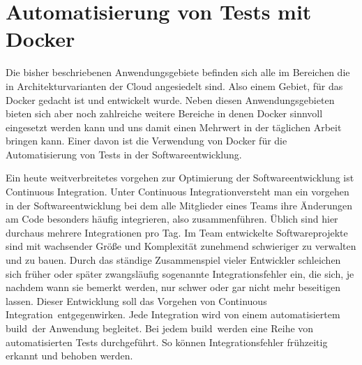 \section{Automatisierung von Tests mit Docker}
\label{sec:automatisierung_von_tests_mit_docker}

Die bisher beschriebenen Anwendungsgebiete befinden sich alle im Bereichen die in Architekturvarianten der Cloud angesiedelt sind. Also einem Gebiet, für das Docker gedacht ist und entwickelt wurde. Neben diesen Anwendungsgebieten bieten sich aber noch zahlreiche weitere Bereiche in denen Docker sinnvoll eingesetzt werden kann und uns damit einen Mehrwert in der täglichen Arbeit bringen kann.
Einer davon ist die Verwendung von Docker für die Automatisierung von Tests in der Softwareentwicklung.

Ein heute weitverbreitetes vorgehen zur Optimierung der Softwareentwicklung ist \grq Continuous Integration\grq . Unter \grq Continuous Integration\grq versteht man ein vorgehen in der Softwareentwicklung bei dem alle Mitglieder eines Teams ihre Änderungen am Code besonders häufig integrieren, also zusammenführen. Üblich sind hier durchaus mehrere Integrationen pro Tag. 
\glqq Im Team entwickelte Softwareprojekte sind mit wachsender Größe und Komplexität zunehmend schwieriger zu verwalten und zu bauen. Durch das ständige Zusammenspiel vieler Entwickler schleichen sich früher oder später zwangsläufig sogenannte Integrationsfehler ein, die sich, je nachdem wann sie bemerkt werden, nur schwer oder gar nicht mehr beseitigen lassen.\grqq \cite{feustel_continuous_????}
Dieser Entwicklung soll das Vorgehen von \grq Continuous Integration\grq\ entgegenwirken.
Jede Integration wird von einem automatisiertem \grq build\grq\ der Anwendung begleitet. Bei jedem \grq build\grq\ werden eine Reihe von automatisierten Tests durchgeführt. So können Integrationsfehler frühzeitig erkannt und behoben werden.

